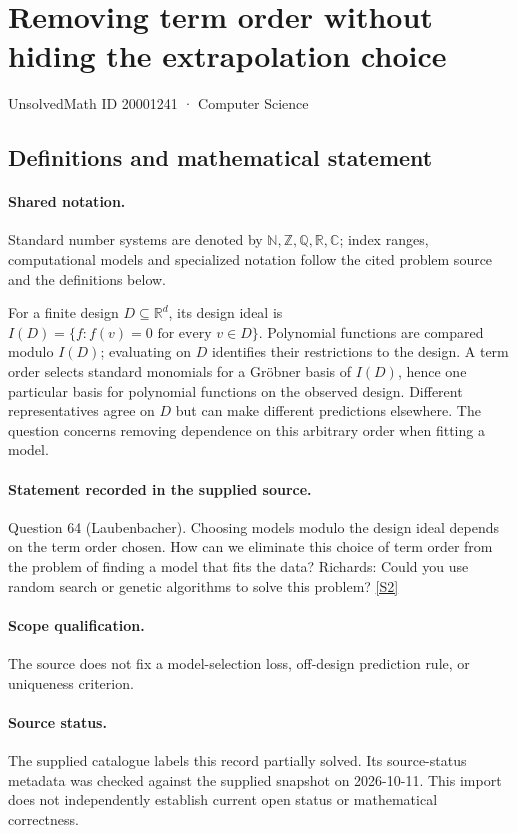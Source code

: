 \documentclass[11pt]{article}
\newcommand{\sref}[2]{\hyperlink{source:#1:#2}{[S#2]}}
\begin{document}
\setcounter{section}{20001240}
\section{Removing term order without hiding the extrapolation choice}\label{20001241}
{\small\sffamily UnsolvedMath ID 20001241 · Computer Science}
\subsection{Definitions and mathematical statement}

\paragraph{Shared notation.}Standard number systems are denoted by $\mathbb N,\mathbb Z,\mathbb Q,\mathbb R,\mathbb C$; index ranges, computational models and specialized notation follow the cited problem source and the definitions below.


For a finite design $D\subseteq\mathbb R^d$, its design ideal is $I(D)=\{f:f(v)=0\text{ for every }v\in D\}$. Polynomial functions are compared modulo $I(D)$; evaluating on $D$ identifies their restrictions to the design. A term order selects standard monomials for a Gröbner basis of $I(D)$, hence one particular basis for polynomial functions on the observed design. Different representatives agree on $D$ but can make different predictions elsewhere. The question concerns removing dependence on this arbitrary order when fitting a model.
\paragraph{Statement recorded in the supplied source.}
Question 64 (Laubenbacher). Choosing models modulo the design ideal depends on the term order chosen. How can we eliminate this choice of term order from the problem of finding a model that fits the data? Richards: Could you use random search or genetic algorithms to solve this problem? \sref{20001241}{2}
\paragraph{Scope qualification.}
The source does not fix a model-selection loss, off-design prediction rule, or uniqueness criterion.
\paragraph{Source status.}
The supplied catalogue labels this record partially solved. Its source-status metadata was checked against the supplied snapshot on 2026-10-11. This import does not independently establish current open status or mathematical correctness.
\end{document}
